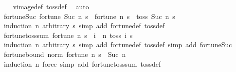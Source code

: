 \begin{isabellebody}
%
\isadelimproof
\ \ %
\endisadelimproof
%
\isatagproof
{}\isamarkupfalse%
\ vimage{\isacharunderscore}{\kern0pt}def\ toss{\isacharunderscore}{\kern0pt}def\ \isamarkupfalse%
\ auto%
\endisatagproof
{\isafoldproof}%
%
\isadelimproof
\isanewline
%
\endisadelimproof
\isanewline
{}\isamarkupfalse%
\ fortune{\isacharunderscore}{\kern0pt}Suc{\isacharcolon}{\kern0pt}\ {\isachardoublequoteopen}fortune\ {\isacharparenleft}{\kern0pt}Suc\ n{\isacharparenright}{\kern0pt}\ s\ {\isacharequal}{\kern0pt}\ fortune\ n\ s\ {\isacharplus}{\kern0pt}\ toss\ {\isacharparenleft}{\kern0pt}Suc\ n{\isacharparenright}{\kern0pt}\ s{\isachardoublequoteclose}\isanewline
%
\isadelimproof
\ \ %
\endisadelimproof
%
\isatagproof
{}\isamarkupfalse%
\ {\isacharparenleft}{\kern0pt}induction\ n\ arbitrary{\isacharcolon}{\kern0pt}\ s{\isacharparenright}{\kern0pt}\ {\isacharparenleft}{\kern0pt}simp\ add{\isacharcolon}{\kern0pt}\ fortune{\isacharunderscore}{\kern0pt}def\ toss{\isacharunderscore}{\kern0pt}def{\isacharparenright}{\kern0pt}{\isacharplus}{\kern0pt}%
\endisatagproof
{\isafoldproof}%
%
\isadelimproof
\isanewline
%
\endisadelimproof
\isanewline
{}\isamarkupfalse%
\ fortune{\isacharunderscore}{\kern0pt}toss{\isacharunderscore}{\kern0pt}sum{\isacharcolon}{\kern0pt}\ {\isachardoublequoteopen}fortune\ n\ s\ {\isacharequal}{\kern0pt}\ {\isacharparenleft}{\kern0pt}{\isasymSum}i\ {\isasymin}\ {\isacharbraceleft}{\kern0pt}{\isachardot}{\kern0pt}{\isachardot}{\kern0pt}n{\isacharbraceright}{\kern0pt}{\isachardot}{\kern0pt}\ toss\ i\ s{\isacharparenright}{\kern0pt}{\isachardoublequoteclose}\isanewline
%
\isadelimproof
\ \ %
\endisadelimproof
%
\isatagproof
{}\isamarkupfalse%
\ {\isacharparenleft}{\kern0pt}induction\ n\ arbitrary{\isacharcolon}{\kern0pt}\ s{\isacharparenright}{\kern0pt}\ {\isacharparenleft}{\kern0pt}simp\ add{\isacharcolon}{\kern0pt}\ fortune{\isacharunderscore}{\kern0pt}def\ toss{\isacharunderscore}{\kern0pt}def{\isacharcomma}{\kern0pt}\ simp\ add{\isacharcolon}{\kern0pt}\ fortune{\isacharunderscore}{\kern0pt}Suc{\isacharparenright}{\kern0pt}%
\endisatagproof
{\isafoldproof}%
%
\isadelimproof
\isanewline
%
\endisadelimproof
\isanewline
{}\isamarkupfalse%
\ fortune{\isacharunderscore}{\kern0pt}bound{\isacharcolon}{\kern0pt}\ {\isachardoublequoteopen}norm\ {\isacharparenleft}{\kern0pt}fortune\ n\ s{\isacharparenright}{\kern0pt}\ {\isasymle}\ Suc\ n{\isachardoublequoteclose}%
\isadelimproof
\ %
\endisadelimproof
%
\isatagproof
{}\isamarkupfalse%
\ {\isacharparenleft}{\kern0pt}induction\ n{\isacharparenright}{\kern0pt}\ {\isacharparenleft}{\kern0pt}force\ simp\ add{\isacharcolon}{\kern0pt}\ fortune{\isacharunderscore}{\kern0pt}toss{\isacharunderscore}{\kern0pt}sum\ toss{\isacharunderscore}{\kern0pt}def{\isacharparenright}{\kern0pt}{\isacharplus}{\kern0pt}%

\end{isabellebody}
